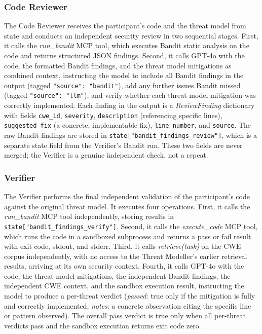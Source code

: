 \subsubsection*{Code Reviewer}

The Code Reviewer receives the participant's code and the threat model from state and conducts an independent security review in two sequential stages. First, it calls the \textit{run\_bandit} MCP tool, which executes Bandit static analysis on the code and returns structured JSON findings. Second, it calls GPT-4o with the code, the formatted Bandit findings, and the threat model mitigations as combined context, instructing the model to include all Bandit findings in the output (tagged \texttt{"source": "bandit"}), add any further issues Bandit missed (tagged \texttt{"source": "llm"}), and verify whether each threat model mitigation was correctly implemented. Each finding in the output is a \textit{ReviewFinding} dictionary with fields \texttt{cwe\_id}, \texttt{severity}, \texttt{description} (referencing specific lines), \texttt{suggested\_fix} (a concrete, implementable fix), \texttt{line\_number}, and \texttt{source}. The raw Bandit findings are stored in \texttt{state["bandit\_findings\_review"]}, which is a separate state field from the Verifier's Bandit run. These two fields are never merged; the Verifier is a genuine independent check, not a repeat.

\subsubsection*{Verifier}

The Verifier performs the final independent validation of the participant's code against the original threat model. It executes four operations. First, it calls the \textit{run\_bandit} MCP tool independently, storing results in \texttt{state["bandit\_findings\_verify"]}. Second, it calls the \textit{execute\_code} MCP tool, which runs the code in a sandboxed subprocess and returns a pass or fail result with exit code, stdout, and stderr. Third, it calls \textit{retrieve(task)} on the CWE corpus independently, with no access to the Threat Modeller's earlier retrieval results, arriving at its own security context. Fourth, it calls GPT-4o with the code, the threat model mitigations, the independent Bandit findings, the independent CWE context, and the sandbox execution result, instructing the model to produce a per-threat verdict (\textit{passed}: true only if the mitigation is fully and correctly implemented, \textit{notes}: a concrete observation citing the specific line or pattern observed). The overall pass verdict is true only when all per-threat verdicts pass and the sandbox execution returns exit code zero.


